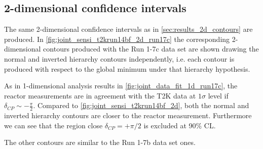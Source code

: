 \clearpage




















%
%

\subsection {2-dimensional confidence intervals}
\label{sec:results_2d_contours_run17c}

The same 2-dimensional confidence intervals as in \cref{sec:results_2d_contours} are produced.
In \cref{fig:joint_sensi_t2krun14bf_2d_run17c} the corresponding 2-dimensional contours produced
with the Run 1-7c data set are shown drawing the normal and inverted hierarchy contours independently,
i.e. each contour is produced with respect to the global minimum under that hierarchy hypothesis.

As in 1-dimensional analysis results
in \cref{fig:joint_data_fit_1d_run17c}, the reactor measurements are 
in agreement with the T2K data at $1\sigma$ level if $\delta_{CP} \sim - \frac{\pi}{2}$. 
Compared to \cref{fig:joint_sensi_t2krun14bf_2d}, both the normal and inverted 
hierarchy contours are closer to the reactor measurement.
Furthermore we can see that the region close $\delta_{CP} = + \pi/2$ is excluded at 90\% CL.

The other contours are similar to the Run 1-7b data set ones.

